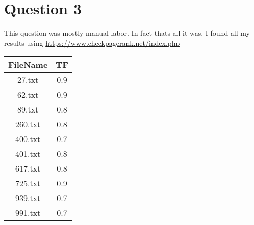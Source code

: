 \documentclass[11pt]{report}
\begin{document}
\section{Question 3}
This question was mostly manual labor. In fact thats all it was. I found all my results using \url{https://www.checkpagerank.net/index.php}
\begin{center}
\begin{tabular}{ |c|c| } 
 \hline
FileName & TF \\\hline 
27.txt & 0.9 \\\hline
62.txt & 0.9 \\\hline
89.txt & 0.8\\\hline
260.txt & 0.8 \\\hline
400.txt & 0.7 \\\hline
401.txt & 0.8 \\\hline
617.txt & 0.8 \\\hline
725.txt & 0.9\\\hline
939.txt & 0.7 \\\hline
991.txt & 0.7  \\\hline
\end{tabular}
\end{center}
\end{document}
